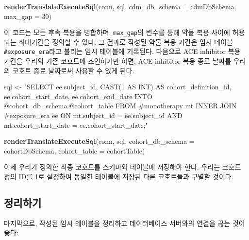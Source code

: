\documentclass[11pt]{book}
\newenvironment{Shaded}{\begin{snugshade}}{\end{snugshade}}
\newcommand{\KeywordTok}[1]{\textcolor[rgb]{0.13,0.29,0.53}{\textbf{#1}}}
\newcommand{\DataTypeTok}[1]{\textcolor[rgb]{0.13,0.29,0.53}{#1}}
\newcommand{\DecValTok}[1]{\textcolor[rgb]{0.00,0.00,0.81}{#1}}
\newcommand{\StringTok}[1]{\textcolor[rgb]{0.31,0.60,0.02}{#1}}
\newcommand{\NormalTok}[1]{#1}
\theoremstyle{definition}
\theoremstyle{definition}
\theoremstyle{definition}
\theoremstyle{remark}
\begin{document}
\begin{Shaded}
\begin{Highlighting}[]
\KeywordTok{renderTranslateExecuteSql}\NormalTok{(conn,}
\NormalTok{                          sql,}
                          \DataTypeTok{cdm_db_schema =}\NormalTok{ cdmDbSchema,}
                          \DataTypeTok{max_gap =} \DecValTok{30}\NormalTok{)}
\end{Highlighting}
\end{Shaded}

이 코드는 모든 후속 복용을 병합하며, \texttt{max\_gap}의 변수를 통해
약물 복용 사이에 허용되는 최대기간을 정의할 수 있다. 그 결과로 작성된
약물 복용 기간은 임시 테이블 \texttt{\#exposure\_era}라고 불리는 임시
테이블에 기록된다. 다음으로 ACE inhibitor 복용 기간을 우리의 기존
코호트에 조인하기만 하면, ACE inhibitor 복용 종료 날짜를 우리의 코호트
종료 날짜로써 사용할 수 있게 된다.

\begin{Shaded}
\begin{Highlighting}[]
\NormalTok{sql <-}\StringTok{ "SELECT ee.subject_id,}
\StringTok{  CAST(1 AS INT) AS cohort_definition_id,}
\StringTok{  ee.cohort_start_date,}
\StringTok{  ee.cohort_end_date}
\StringTok{INTO @cohort_db_schema.@cohort_table}
\StringTok{FROM #monotherapy mt}
\StringTok{INNER JOIN #exposure_era ee}
\StringTok{  ON mt.subject_id = ee.subject_id}
\StringTok{    AND mt.cohort_start_date = ee.cohort_start_date;"}

\KeywordTok{renderTranslateExecuteSql}\NormalTok{(conn,}
\NormalTok{                          sql,}
                          \DataTypeTok{cohort_db_schema =}\NormalTok{ cohortDbSchema,}
                          \DataTypeTok{cohort_table =}\NormalTok{ cohortTable)}
\end{Highlighting}
\end{Shaded}

이제 우리가 정의한 최종 코호트를 스키마와 테이블에 저장해야 한다. 우리는
코호트 정의 ID를 1로 설정하여 동일한 테이블에 저장된 다른 코호트들과
구별할 것이다.

\subsection{정리하기}

마지막으로, 작성된 임시 테이블을 정리하고 데이터베이스 서버와의 연결을
끊는 것이 좋다:
\end{document}
